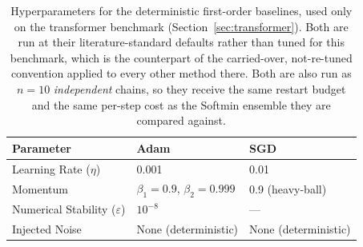 \documentclass{article} %
\theoremstyle{plain}
\theoremstyle{definition}
\theoremstyle{remark}
\begin{document}
\begin{table}[!htbp]
\centering
\caption{Hyperparameters for the deterministic first-order baselines, used only on the transformer
benchmark (Section~\ref{sec:transformer}). Both are run at their literature-standard defaults
rather than tuned for this benchmark, which is the counterpart of the carried-over,
not-re-tuned convention applied to every other method there. Both are also run as $n=10$
\emph{independent} chains, so they receive the same restart budget and the same per-step cost as
the Softmin ensemble they are compared against.}
\label{tab:adam_sgd_hyperparams}
\begin{tabular}{@{}lll@{}}
\toprule
\textbf{Parameter} & \textbf{Adam} & \textbf{SGD} \\
\midrule
Learning Rate ($\eta$) & 0.001 & 0.01 \\
Momentum & $\beta_1=0.9$, $\beta_2=0.999$ & 0.9 (heavy-ball) \\
Numerical Stability ($\varepsilon$) & $10^{-8}$ & --- \\
Injected Noise & None (deterministic) & None (deterministic) \\
\bottomrule
\end{tabular}
\end{table}
\end{document}
